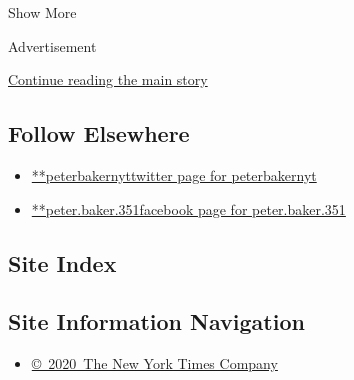 Show More

Advertisement

\protect\hyperlink{after-mid2}{Continue reading the main story}

\hypertarget{follow-elsewhere}{%
\subsection{Follow Elsewhere}\label{follow-elsewhere}}

\begin{itemize}
\tightlist
\item
  \href{https://twitter.com/peterbakernyt}{**peterbakernyttwitter page
  for peterbakernyt}
\item
  \href{https://www.facebookcorewwwi.onion/peter.baker.351}{**peter.baker.351facebook
  page for peter.baker.351}
\end{itemize}

\hypertarget{site-index}{%
\subsection{Site Index}\label{site-index}}

\hypertarget{site-information-navigation}{%
\subsection{Site Information
Navigation}\label{site-information-navigation}}

\begin{itemize}
\tightlist
\item
  \href{https://help.nytimes3xbfgragh.onion/hc/en-us/articles/115014792127-Copyright-notice}{©~2020~The
  New York Times Company}
\end{itemize}

